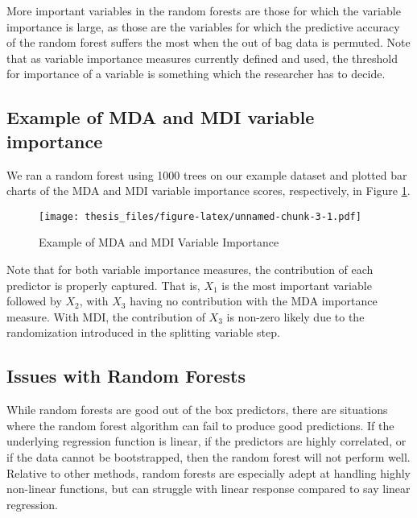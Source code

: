 \documentclass[12pt,twoside]{reedthesis}
\theoremstyle{definition}
\theoremstyle{definition}
\theoremstyle{definition}
\theoremstyle{remark}
\begin{document}
More important variables in the random forests are those for which the
variable importance is large, as those are the variables for which the
predictive accuracy of the random forest suffers the most when the out
of bag data is permuted. Note that as variable importance measures
currently defined and used, the threshold for importance of a variable
is something which the researcher has to decide. \par

\subsection{Example of MDA and MDI variable
importance}\label{example-of-mda-and-mdi-variable-importance}

We ran a random forest using 1000 trees on our example dataset and
plotted bar charts of the MDA and MDI variable importance scores,
respectively, in Figure \ref{mda_ex}. \par
\begin{figure}
\centering
\texttt{[image: thesis\_files/figure-latex/unnamed-chunk-3-1.pdf]}
\caption{\label{fig:unnamed-chunk-3}\label{mda_ex}Example of MDA and MDI
Variable Importance}
\end{figure}
Note that for both variable importance measures, the contribution of
each predictor is properly captured. That is, \(X_1\) is the most
important variable followed by \(X_2\), with \(X_3\) having no
contribution with the MDA importance measure. With MDI, the contribution
of \(X_3\) is non-zero likely due to the randomization introduced in the
splitting variable step.

\subsection{Issues with Random
Forests}\label{issues-with-random-forests}

While random forests are good out of the box predictors, there are
situations where the random forest algorithm can fail to produce good
predictions. If the underlying regression function is linear, if the
predictors are highly correlated, or if the data cannot be bootstrapped,
then the random forest will not perform well. Relative to other methods,
random forests are especially adept at handling highly non-linear
functions, but can struggle with linear response compared to say linear
regression. \par
\end{document}
